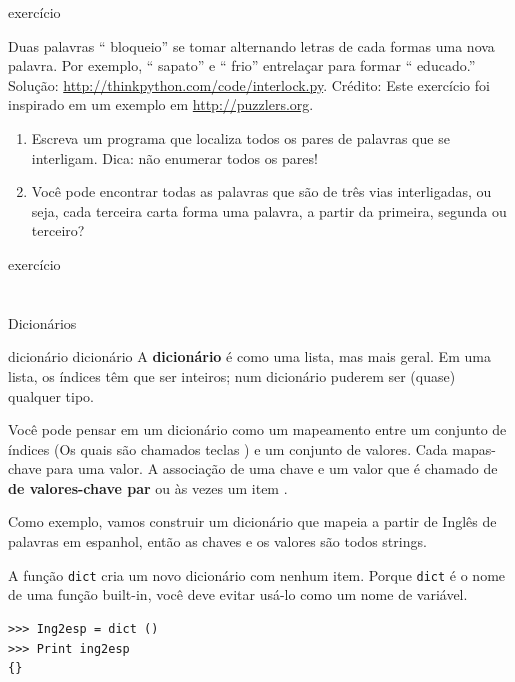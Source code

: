 \documentclass[10pt]{book}
\begin{document}
\begin{} exercício

Duas palavras `` bloqueio'' se tomar alternando letras de cada formas
uma nova palavra. Por exemplo, `` sapato'' e `` frio''
entrelaçar para formar `` educado.''
Solução: \url{http://thinkpython.com/code/interlock.py}.
Crédito: Este exercício foi inspirado em um exemplo em \url{http://puzzlers.org}.

\begin{enumerate}

\item Escreva um programa que localiza todos os pares de palavras que se interligam.
  Dica: não enumerar todos os pares!

\item Você pode encontrar todas as palavras que são de três vias interligadas, ou seja,
  cada terceira carta forma uma palavra, a partir da primeira, segunda ou
  terceiro?

\end{enumerate}
\end{} exercício


\chapter{} Dicionários

\index{} dicionário
\index{} dicionário
A {\bf dicionário} é como uma lista, mas mais geral. Em uma lista,
os índices têm que ser inteiros; num dicionário puderem
ser (quase) qualquer tipo.

Você pode pensar em um dicionário como um mapeamento entre um conjunto de índices
(Os quais são chamados teclas {\bf}) e um conjunto de valores. Cada mapas-chave para uma
valor. A associação de uma chave e um valor que é chamado de {\bf
  de valores-chave par} ou {às vezes um item \bf}.

Como exemplo, vamos construir um dicionário que mapeia a partir de Inglês
de palavras em espanhol, então as chaves e os valores são todos strings.

A função {\tt dict} cria um novo dicionário com nenhum item.
Porque {\tt dict} é o nome de uma função built-in, você
deve evitar usá-lo como um nome de variável.

\begin{verbatim}
>>> Ing2esp = dict ()
>>> Print ing2esp
{}
\end{verbatim}
\end{document}
